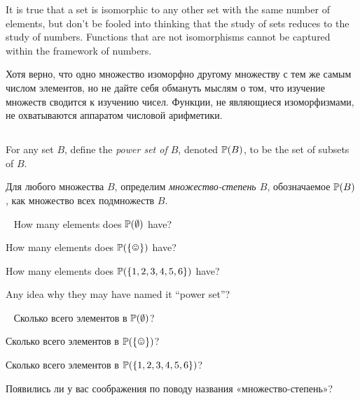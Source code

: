 \documentclass[CT4S-EN-RU]{subfiles}
\begin{document}
\begin{sloganENG}
It is true that a set is isomorphic to any other set with the same number of elements, but don't be fooled into thinking that the study of sets reduces to the study of numbers. Functions that are not isomorphisms cannot be captured within the framework of numbers. 
\end{sloganENG}

\begin{sloganRUS}
Хотя верно, что одно множество изоморфно другому множеству с тем же самым числом элементов, но не дайте себя обмануть мыслям о том, что изучение множеств сводится к изучению чисел. Функции, не являющиеся изоморфизмами, не охватываются аппаратом числовой арифметики. 
\end{sloganRUS}


\subsection{}

\begin{definitionENG}\label{def:power set}
For any set $B$, define the {\em power set of $B$}, denoted ${\mathbb P}(B)$, to be the set of subsets of $B$.
\end{definitionENG}

\begin{definitionRUS}\label{def:power set}
Для любого множества $B$, определим {\em множество-степень $B$}, обозначаемое ${\mathbb P}(B)$, как множество всех подмножеств $B$.
\end{definitionRUS}

\begin{exerciseENG}\label{exc:size of power sets}~
\sexc How many elements does ${\mathbb P}(\emptyset)$ have? 
\item How many elements does $\PP(\singleton)$ have? 
\item How many elements does ${\mathbb P}(\{1,2,3,4,5,6\})$ have? 
\item Any idea why they may have named it “power set”?
\endsexc
\end{exerciseENG}

\begin{exerciseRUS}\label{exc:size of power sets}~
\sexc Сколько всего элементов в ${\mathbb P}(\emptyset)$? 
\item Сколько всего элементов в $\PP(\singleton)$? 
\item Сколько всего элементов в ${\mathbb P}(\{1,2,3,4,5,6\})$? 
\item Появились ли у вас соображения по поводу названия «множество-степень»?
\endsexc
\end{exerciseRUS}
\end{document}
